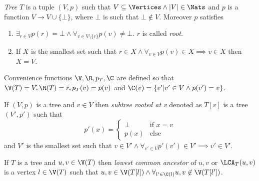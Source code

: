 \begin{defi}
    \emph{Tree} $T$ is a tuple $(V, p)$ such that $V \subseteq \Vertices \land |V| \in \Nats$ and $p$ is a function $V \to V \cup \{\bot\}$, where $\bot$ is such that $\bot \not\in V$. Moreover $p$ satisfies
    \begin{enumerate}
        \item $\exists_{r \in V} p(r) = \bot \land \forall_{v \in V\setminus\{r\}} p(v) \neq \bot$. $r$ is called \emph{root}.
        \item If $X$ is the smallest set such that $r \in X \land \forall_{v \in V} p(v) \in X \implies v \in X$ then $X = V$.
    \end{enumerate}
    Convenience functions $\V, \R, p_T, \C$ are defined so that $\V(T) = V, \R(T) = r, p_T(v) = p(v)$ and $\C(v) = \{v' | v' \in V \land p(v') = v\}$.
\end{defi}

\begin{defi}
    If $(V,p)$ is a tree and $v \in V$ then \emph{subtree rooted at v} denoted as $T[v]$ is a tree $(V', p')$ such that
    \[
        p'(x) = \begin{cases}
            \bot & \text{if } x = v \\
            p(x) & \text{else}
        \end{cases}
    \]
    and $V'$ is the smallest set such that $v \in V' \land \forall_{v' \in V} p'(v') \in V' \implies v' \in V'$.
\end{defi}

\begin{defi}
    If $T$ is a tree and $u,v \in \V(T)$ then \emph{lowest common ancestor} of $u, v$ or $\LCA_T(u,v)$ is a vertex $l \in \V(T)$ such that $u,v \in \V(T[l]) \land \forall_{l' \in \C(l)} u,v \not\in \V(T[l'])$.
\end{defi}